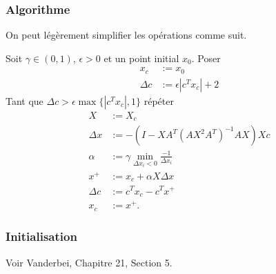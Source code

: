 \documentclass[t,usepdftitle=false]{beamer}
\begin{document}
\begin{frame}
	\frametitle{Algorithme}
	
	On peut légèrement simplifier les opérations comme suit.
	
	Soit $\gamma \in (0,1)$, $\epsilon > 0$ et un point initial $x_0$.
	Poser
	\begin{align*}
		x_c &:= x_0 \\
		\Delta c &:= \epsilon|c^Tx_c|+2
	\end{align*}
	Tant que $\Delta c > \epsilon\max\{|c^Tx_c|,1\}$ répéter
	\begin{align*}
		X &:= X_c \\
		\Delta x &:= -(I - XA^T(AX^2A^T)^{-1}AX)Xc \\
		\alpha &:= \gamma \min_{\Delta x_i < 0} \frac{-1}{\Delta x_i} \\
		x^+ &:= x_c + \alpha X \Delta x \\
		\Delta c &:= c^Tx_c - c^Tx^+ \\
		x_c &:= x^+.
	\end{align*}
	
\end{frame}

\begin{frame}
\frametitle{Initialisation}

Voir Vanderbei, Chapitre 21, Section 5.
\end{frame}
\end{document}
